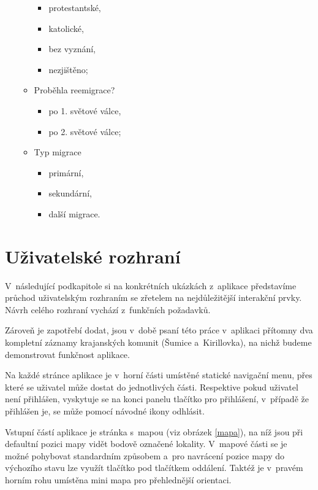 \begin{itemize}
\begin{itemize}
    \begin{itemize}
    \tightlist
    \item
      protestantské,
    \item
      katolické,
    \item
      bez vyznání,
    \item
      nezjištěno;
    \end{itemize}
  \item
    Proběhla reemigrace?

    \begin{itemize}
    \tightlist
    \item
      po 1. světové válce,
    \item
      po 2. světové válce;
    \end{itemize}
  \item
    Typ migrace

    \begin{itemize}
    \tightlist
    \item
      primární,
    \item
      sekundární,
    \item
      další migrace.
    \end{itemize}
  \end{itemize}
\end{itemize}

\hypertarget{uux17eivatelskuxe9-rozhranuxed}{%
\section{Uživatelské rozhraní}\label{uux17eivatelskuxe9-rozhranuxed}}

V~následující podkapitole si na konkrétních ukázkách z~aplikace představíme průchod uživatelským rozhraním se zřetelem na nejdůležitější interakční prvky. Návrh celého rozhraní vychází z~funkčních požadavků.

Zároveň je zapotřebí dodat, jsou v~době psaní této práce v~aplikaci přítomny dva kompletní záznamy krajanských komunit (Šumice a~Kirillovka), na nichž budeme demonstrovat funkčnost aplikace.

Na každé stránce aplikace je v~horní části umístěné statické navigační menu, přes které se uživatel může dostat do jednotlivých části. Respektive pokud uživatel není přihlášen, vyskytuje se na konci panelu tlačítko pro přihlášení, v~případě že přihlášen je, se může pomocí návodné ikony odhlásit.

Vstupní částí aplikace je stránka s~mapou (viz obrázek \ref{mapa}), na níž jsou při defaultní pozici mapy vidět bodově označené lokality. V~mapové části se je možné pohybovat standardním způsobem a~pro navrácení pozice mapy do výchozího stavu lze využít tlačítko pod tlačítkem oddálení. Taktéž je v~pravém horním rohu umístěna mini mapa pro přehlednější orientaci.


